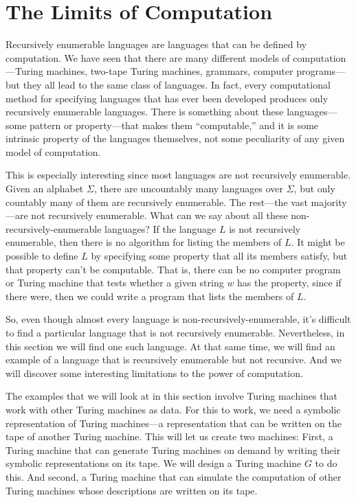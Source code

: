 \section{The Limits of Computation}\label{S-turing-3}

Recursively enumerable languages are languages that can be defined by computation.
We have seen that there are many different models of compu\-tation---Turing machines,
two-tape Turing machines, grammars, computer programs---but they all lead
to the same class of languages.  In fact, every computational method for
specifying languages that has ever been developed produces only recursively
enumerable languages.  There is something about these languages---some pattern
or property---that makes them ``computable,''  and it is some intrinsic
property of the languages themselves, not some peculiarity of any given
model of computation.

This is especially interesting since most languages are not recursively enumerable.
Given an alphabet $\Sigma$, there are uncountably many languages over $\Sigma$, but
only countably many of them are recursively enumerable.  The rest---the vast
majority---are not recursively enumerable.  What can we say about
all these non-recursively-enumerable languages?  If the language $L$ is not
recursively enumerable, then there is no algorithm for listing the members of
$L$.  It might be possible to define $L$ by specifying some property that
all its members satisfy, but that property can't be computable.  That is, there
can be no computer program or Turing machine that tests whether a given
string $w$ has the property, since if there were, then we could write a
program that lists the members of $L$.

So, even though almost every language is non-recursively-enumerable, it's
difficult to find a particular language that is not recursively enumerable.
Nevertheless, in this section we will find one such language.  At that same
time, we will find an example of a language that is recursively enumerable
but not recursive.  And we will discover some interesting limitations to
the power of computation.

\medskip

The examples that we will look at in this section involve Turing
machines that work with other Turing machines as data.  For this to
work, we need a symbolic representation of Turing machines---a
representation that can be written on the tape of another Turing
machine.  This will let us create two machines:  First,
a Turing machine that can generate Turing machines
on demand by writing their symbolic representations on its tape.
We will design a Turing machine $G$ to do this.  And second,
a Turing machine that can simulate the computation of other
Turing machines whose descriptions are written on its tape.


